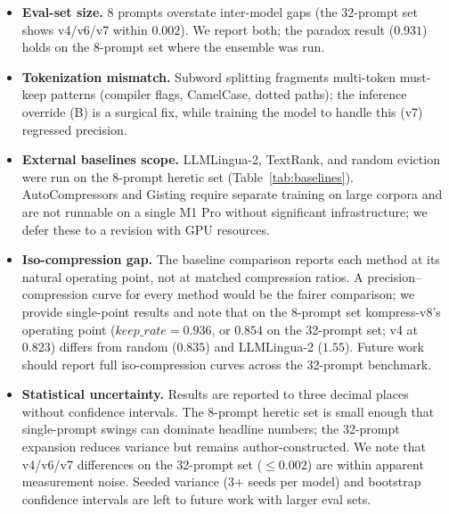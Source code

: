 \begin{itemize}
  \item \textbf{Eval-set size.} 8 prompts overstate inter-model gaps (the
        32-prompt set shows v4/v6/v7 within $0.002$). We report both; the
        paradox result ($0.931$) holds on the 8-prompt set where the
        ensemble was run.
  \item \textbf{Tokenization mismatch.} Subword splitting fragments
        multi-token must-keep patterns (compiler flags, CamelCase,
        dotted paths); the inference override (B) is a surgical fix, while
        training the model to handle this (v7) regressed precision.
  \item \textbf{External baselines scope.} LLMLingua-2, TextRank, and random
        eviction were run on the 8-prompt heretic set (Table~\ref{tab:baselines}).
        AutoCompressors and Gisting require separate training on large corpora
        and are not runnable on a single M1 Pro without significant
        infrastructure; we defer these to a revision with GPU resources.
  \item \textbf{Iso-compression gap.} The baseline comparison reports each
        method at its natural operating point, not at matched compression
        ratios. A precision--compression curve for every method would be the
        fairer comparison; we provide single-point results and note that on the
        8-prompt set kompress-v8's operating point ($\mathit{keep\_rate}=0.936$,
        or $0.854$ on the 32-prompt set; v4 at $0.823$) differs from random
        ($0.835$) and LLMLingua-2 ($1.55$). Future work should report full
        iso-compression curves across the 32-prompt benchmark.
  \item \textbf{Statistical uncertainty.} Results are reported to three
        decimal places without confidence intervals. The 8-prompt heretic
        set is small enough that single-prompt swings can dominate headline
        numbers; the 32-prompt expansion reduces variance but remains
        author-constructed. We note that v4/v6/v7 differences on the
        32-prompt set (${\le}0.002$) are within apparent measurement noise.
        Seeded variance (3+ seeds per model) and bootstrap confidence
        intervals are left to future work with larger eval sets.
\end{itemize}

